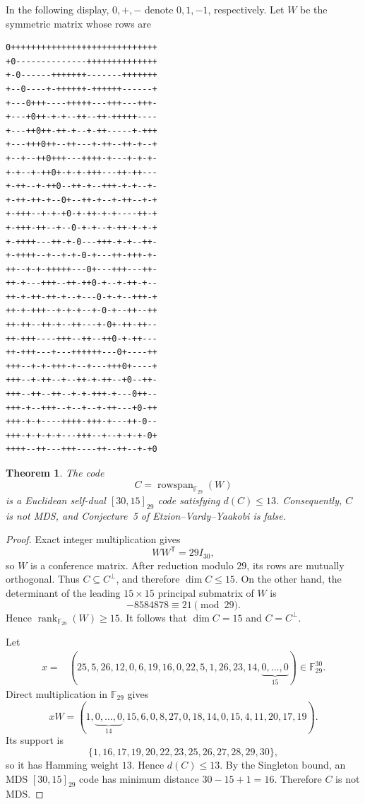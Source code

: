 \documentclass[11pt]{amsart}
\newtheorem{theorem}{Theorem}
\newcommand{\F}{\mathbb{F}}
\DeclareMathOperator{\rank}{rank}
\DeclareMathOperator{\rowspan}{rowspan}
\begin{document}
In the following display, $0,+,-$ denote $0,1,-1$, respectively. Let
$W$ be the symmetric matrix whose rows are

\begin{center}
\begin{minipage}{0.56\textwidth}
\fontsize{7.5}{8.0}\selectfont
\begin{verbatim}
0+++++++++++++++++++++++++++++
+0--------------++++++++++++++
+-0------+++++++-------+++++++
+--0----+-++++++-++++++------+
+---0+++----+++++---+++---+++-
+---+0++-+-+--++--++-+++++----
+---++0++-++-+--+-++-----+-+++
+---+++0++--++---+-++--++-+--+
+--+--++0+++---++++-+---+-+-+-
+-+--+-++0+-+-+-+++---++-++---
+-++--+-++0--++-+--+++-+-+--+-
+-++-++-+--0+--++-+--+-++--+-+
+-+++--+-+-+0-+-++-+-+----++-+
+-+++-++--+--0-+-+--+-++-+-+-+
+-++++---++-+-0---+++-+-+--++-
+-++++--+--+-+-0-+---++-+++-+-
++--+-+-+++++---0+---+++---++-
++-+---+++--++-++0-+--+-++-+--
++-+-++-++-+--+---0-+-+--+++-+
++-+-+++--+-+-+--+-0-+--++--++
++-++--++-+--++---+-0+-++-++--
++-+++----+++--++--++0-+-++---
++-+++---+---++++++---0+----++
+++--+-+-+++-+--+---+++0+----+
+++--+-++--+--++-+-++--+0--++-
+++--++--++--+-+-+++-+---0++--
+++-+--+++--+--+--+-++---+0-++
+++-+-+----++++-+++-+---++-0--
+++-+-+-+-+---+++--+--+-+-+-0+
++++--++---+++----++--++--+-+0
\end{verbatim}
\end{minipage}
\end{center}

\begin{theorem}
The code
\[
  C=\rowspan_{\F_{29}}(W)
\]
is a Euclidean self-dual $[30,15]_{29}$ code satisfying $d(C)\le 13$.
Consequently, $C$ is not MDS, and Conjecture~5 of
Etzion--Vardy--Yaakobi is false.
\end{theorem}

\begin{proof}
Exact integer multiplication gives
\[
  WW^{\mathsf T}=29I_{30},
\]
so $W$ is a conference matrix. After reduction modulo $29$, its rows
are mutually orthogonal. Thus $C\subseteq C^\perp$, and therefore
$\dim C\le 15$. On the other hand, the determinant of the leading
$15\times15$ principal submatrix of $W$ is
\[
  -8584878\equiv 21\pmod{29}.
\]
Hence $\rank_{\F_{29}}(W)\ge15$. It follows that $\dim C=15$ and
$C=C^\perp$.

Let
\[
\begin{aligned}
x={}&(25,5,26,12,0,6,19,16,0,22,5,1,26,23,14,
      \underbrace{0,\ldots,0}_{15})\in\F_{29}^{30}.
\end{aligned}
\]
Direct multiplication in $\F_{29}$ gives
\[
  xW=(1,\underbrace{0,\ldots,0}_{14},
       15,6,0,8,27,0,18,14,0,15,4,11,20,17,19).
\]
Its support is
\[
  \{1,16,17,19,20,22,23,25,26,27,28,29,30\},
\]
so it has Hamming weight $13$. Hence $d(C)\le13$. By the Singleton
bound, an MDS $[30,15]_{29}$ code has minimum distance
$30-15+1=16$. Therefore $C$ is not MDS.
\end{proof}
\end{document}

